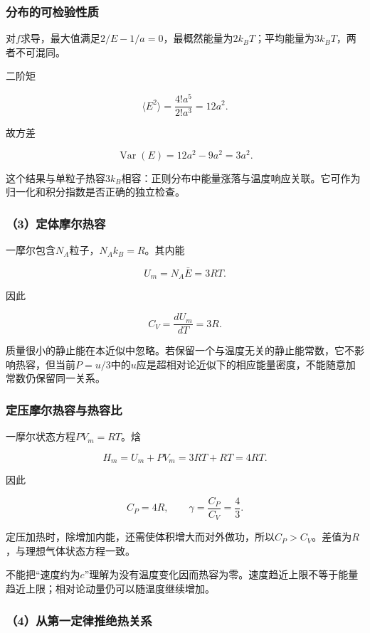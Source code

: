 \documentclass[12pt,a4paper,fontset=fandol]{ctexart}
\begin{document}
\subsubsection{分布的可检验性质}\label{ux5206ux5e03ux7684ux53efux68c0ux9a8cux6027ux8d28}

对\(f\)求导，最大值满足\(2/E-1/a=0\)，最概然能量为\(2k_BT\)；平均能量为\(3k_BT\)，两者不可混同。

二阶矩

\[
\langle E^2\rangle
=\frac{4!a^5}{2!a^3}=12a^2.
\]

故方差

\[
\operatorname{Var}(E)=12a^2-9a^2=3a^2.
\]

这个结果与单粒子热容\(3k_B\)相容：正则分布中能量涨落与温度响应关联。它可作为归一化和积分指数是否正确的独立检查。

\subsubsection{（3）定体摩尔热容}\label{ux5b9aux4f53ux6469ux5c14ux70edux5bb9}

一摩尔包含\(N_A\)粒子，\(N_Ak_B=R\)。其内能

\[
U_m=N_A\bar E=3RT.
\]

因此

\[
\boxed{C_V=\frac{dU_m}{dT}=3R}.
\]

质量很小的静止能在本近似中忽略。若保留一个与温度无关的静止能常数，它不影响热容，但当前\(P=u/3\)中的\(u\)应是超相对论近似下的相应能量密度，不能随意加常数仍保留同一关系。

\subsubsection{定压摩尔热容与热容比}\label{ux5b9aux538bux6469ux5c14ux70edux5bb9ux4e0eux70edux5bb9ux6bd4}

一摩尔状态方程\(PV_m=RT\)。焓

\[
H_m=U_m+PV_m=3RT+RT=4RT.
\]

因此

\[
\boxed{C_P=4R,\qquad\gamma=\frac{C_P}{C_V}=\frac43}.
\]

定压加热时，除增加内能，还需使体积增大而对外做功，所以\(C_P>C_V\)。差值为\(R\)，与理想气体状态方程一致。

不能把``速度约为\(c\)''理解为没有温度变化因而热容为零。速度趋近上限不等于能量趋近上限；相对论动量仍可以随温度继续增加。

\subsubsection{（4）从第一定律推绝热关系}\label{ux4eceux7b2cux4e00ux5b9aux5f8bux63a8ux7eddux70edux5173ux7cfb}
\end{document}
